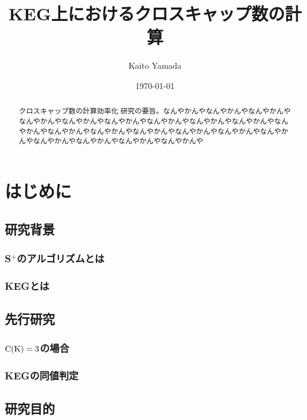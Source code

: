 \documentclass[11pt,a4j]{jarticle}
\title{KEG上におけるクロスキャップ数の計算}
\author{Kaito Yamada}
\date{\today}
\newcommand{\splus}{S${}^\text{+}$}
\newcommand{\fl}[1]{$\rm{#1}$}
\begin{document}
\maketitle
\vspace{30mm}
\begin{abstract}
    クロスキャップ数の計算効率化
    研究の要旨。なんやかんやなんやかんやなんやかんやなんやかんやなんやかんやなんやかんやなんやかんやなんやかんやなんやかんやなんやかんやなんやかんやなんやかんやなんやかんやなんやかんやなんやかんやなんやかんやなんやかんやなんやかんやなんやかんやなんやかんや
\end{abstract}

\clearpage

\tableofcontents

\pagestyle{plain}
\lhead{\rightmark}

\section{はじめに} %

\subsection{研究背景}
\subsubsection{\splus のアルゴリズムとは}
\subsubsection{KEGとは}


\subsection{先行研究}
\subsubsection{\fl{C(K)=3}の場合}
\subsubsection{KEGの同値判定}

\subsection{研究目的}
\end{document}
